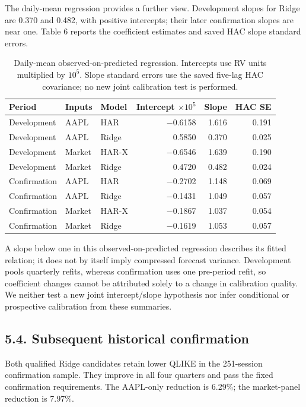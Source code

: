 The daily-mean regression provides a further view. Development slopes
for Ridge are 0.370 and 0.482, with positive intercepts; their later
confirmation slopes are near one. Table 6 reports the coefficient
estimates and saved HAC slope standard errors.

\begin{table}[!t]
\centering
\footnotesize
\caption{Daily-mean observed-on-predicted regression. Intercepts use RV units multiplied by $10^5$. Slope standard errors use the saved five-lag HAC covariance; no new joint calibration test is performed.}
\label{tab:results-6}
\begin{tabular}{lllrrr}
\toprule
Period & Inputs & Model & Intercept $\times10^5$ & Slope & HAC SE \\
\midrule
Development & AAPL & HAR & −0.6158 & 1.616 & 0.191 \\
Development & AAPL & Ridge & 0.5850 & 0.370 & 0.025 \\
Development & Market & HAR-X & −0.6546 & 1.639 & 0.190 \\
Development & Market & Ridge & 0.4720 & 0.482 & 0.024 \\
Confirmation & AAPL & HAR & −0.2702 & 1.148 & 0.069 \\
Confirmation & AAPL & Ridge & −0.1431 & 1.049 & 0.057 \\
Confirmation & Market & HAR-X & −0.1867 & 1.037 & 0.054 \\
Confirmation & Market & Ridge & −0.1619 & 1.053 & 0.057 \\
\bottomrule
\end{tabular}
\end{table}

A slope below one in this observed-on-predicted regression describes its
fitted relation; it does not by itself imply compressed forecast
variance. Development pools quarterly refits, whereas confirmation uses
one pre-period refit, so coefficient changes cannot be attributed solely
to a change in calibration quality. We neither test a new joint
intercept/slope hypothesis nor infer conditional or prospective
calibration from these summaries.

\subsection{5.4. Subsequent historical
confirmation}\label{subsequent-historical-confirmation}

Both qualified Ridge candidates retain lower QLIKE in the 251-session
confirmation sample. They improve in all four quarters and pass the
fixed confirmation requirements. The AAPL-only reduction is 6.29\%; the
market-panel reduction is 7.97\%.

